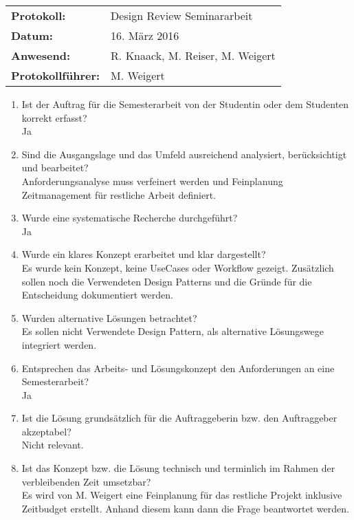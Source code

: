 \begin{tabular}{ll}
	\textbf{Protokoll:} & Design Review Seminararbeit \\
	\textbf{Datum:} & 16. März 2016 \\
	\textbf{Anwesend:} & R. Knaack, M. Reiser, M. Weigert \\
	\textbf{Protokollführer:} & M. Weigert \\
\end{tabular}

\begin{enumerate}
	\item Ist der Auftrag für die Semesterarbeit von der Studentin oder dem Studenten korrekt erfasst? \\
	{\color{DarkSlateBlue}Ja}
	\item Sind die Ausgangslage und das Umfeld ausreichend analysiert, berücksichtigt und bearbeitet? \\
	{\color{DarkSlateBlue}Anforderungsanalyse muss verfeinert werden und Feinplanung Zeitmanagement für restliche Arbeit definiert.}
	\item Wurde eine systematische Recherche durchgeführt?\\
	{\color{DarkSlateBlue}Ja}
	\item Wurde ein klares Konzept erarbeitet und klar dargestellt?\\
	{\color{DarkSlateBlue}Es wurde kein Konzept, keine UseCases oder Workflow gezeigt. Zusätzlich sollen noch die Verwendeten Design Patterns und die Gründe für die Entscheidung dokumentiert werden.}
	\item Wurden alternative Lösungen betrachtet? \\
	{\color{DarkSlateBlue}Es sollen nicht Verwendete Design Pattern, als alternative Lösungswege integriert werden.}
	\item Entsprechen das Arbeits- und Lösungskonzept den Anforderungen an eine Semesterarbeit? \\
	{\color{DarkSlateBlue}Ja}
	\item Ist die Lösung grundsätzlich für die Auftraggeberin bzw. den Auftraggeber akzeptabel? \\
	{\color{DarkSlateBlue}Nicht relevant.}
	\item Ist das Konzept bzw. die Lösung technisch und terminlich im Rahmen der verbleibenden Zeit umsetzbar? \\
	{\color{DarkSlateBlue}Es wird von M. Weigert eine Feinplanung für das restliche Projekt inklusive Zeitbudget erstellt. Anhand diesem kann dann die Frage beantwortet werden.}

\end{enumerate}
